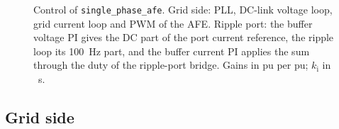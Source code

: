 \documentclass[11pt,a4paper]{scrartcl}
\newcommand{\ped}[1]{_{\mathrm{#1}}}
\newcommand{\code}[1]{\texttt{#1}}
\begin{document}
\begin{onehalfspace}
\begin{figure}[H]
	\captionsetup{width=0.92\textwidth, font=small}
	\caption[Control of the model.]{Control of \code{single\_phase\_afe}. Grid side: PLL, DC-link voltage loop, grid current loop and PWM of the AFE. Ripple port: the buffer voltage PI gives the DC part of the port current reference, the ripple loop its \SI{100}{\hertz} part, and the buffer current PI applies the sum through the duty of the ripple-port bridge. Gains in pu per pu; $k\ped{i}$ in \si{\per\second}.}
	\label{fig:control}
\end{figure}

\subsection{Grid side}


\end{onehalfspace}
\end{document}
